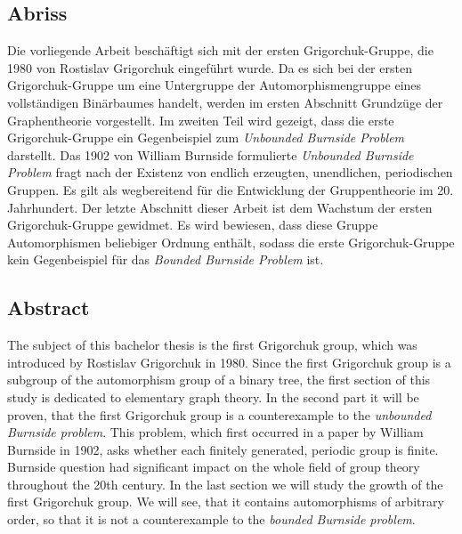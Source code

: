 \thispagestyle{empty}

\begin{de}
\section*{Abriss}
\sloppypar%
Die vorliegende Arbeit beschäftigt sich mit der ersten Gri\-gor\-chuk-Grup\-pe, die 1980 von Rostislav Grigorchuk eingef\"uhrt wurde. Da es sich bei der ersten Grigorchuk-Gruppe um eine Untergruppe der Automorphismengruppe eines vollst\"andigen Bin\"arbaumes handelt, werden im ersten Abschnitt Grundz\"uge der Graphentheorie vorgestellt. Im zweiten Teil wird gezeigt, dass die erste Grigorchuk-Gruppe ein Gegenbeispiel zum \emph{Unbounded Burnside Problem} darstellt. Das 1902 von William Burnside formulierte \emph{Unbounded Burnside Problem} fragt nach der Existenz von  endlich erzeugten, unendlichen, periodischen Gruppen. Es gilt als wegbereitend f\"ur die Entwicklung der Gruppentheorie im 20. Jahrhundert. Der letzte Abschnitt dieser Arbeit ist dem Wachstum der ersten Grigorchuk-Gruppe gewidmet. Es wird bewiesen, dass diese Gruppe Automorphismen beliebiger Ordnung enth\"alt, sodass die erste Grigorchuk-Gruppe kein Gegenbeispiel f\"ur das \emph{Bounded Burnside Problem} ist.\par
\end{de}

\section*{Abstract}
The subject of this bachelor thesis is the first Grigorchuk group, which was introduced by Rostislav Grigorchuk in 1980. Since the first Grigorchuk group is a subgroup of the automorphism group of a binary tree, the first section of this study is dedicated to elementary graph theory. In the second part it will be proven, that the first Grigorchuk group is a counterexample to the \emph{unbounded Burnside problem}. This problem, which first occurred in a paper by William Burnside in 1902, asks whether each finitely generated, periodic group is finite. Burnside question had significant impact on the whole field of group theory throughout the 20th century. In the last section we will study the growth of the first Grigorchuk group. We will see, that it contains automorphisms of arbitrary order, so that it is not a counterexample to the \emph{bounded Burnside problem}.

\newpage
\chapter*{\contentsname}

